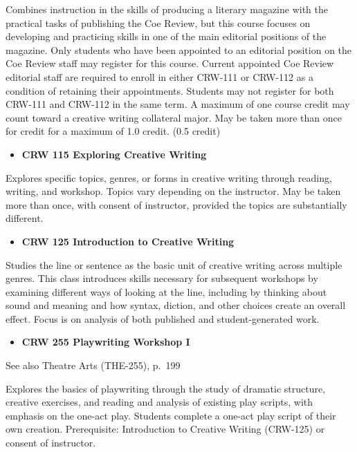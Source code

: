 \documentclass[
  letterpaper,
]{scrbook}
\providecommand{\tightlist}{%
  \setlength{\itemsep}{0pt}\setlength{\parskip}{0pt}}
\begin{document}
Combines instruction in the skills of producing a literary magazine with
the practical tasks of publishing the Coe Review, but this course
focuses on developing and practicing skills in one of the main editorial
positions of the magazine. Only students who have been appointed to an
editorial position on the Coe Review staff may register for this course.
Current appointed Coe Review editorial staff are required to enroll in
either CRW-111 or CRW-112 as a condition of retaining their
appointments. Students may not register for both CRW-111 and CRW-112 in
the same term. A maximum of one course credit may count toward a
creative writing collateral major. May be taken more than once for
credit for a maximum of 1.0 credit. (0.5 credit)

\begin{itemize}
\tightlist
\item
  \textbf{CRW 115 Exploring Creative Writing}
\end{itemize}

Explores specific topics, genres, or forms in creative writing through
reading, writing, and workshop. Topics vary depending on the instructor.
May be taken more than once, with consent of instructor, provided the
topics are substantially different.

\begin{itemize}
\tightlist
\item
  \textbf{CRW 125 Introduction to Creative Writing}
\end{itemize}

Studies the line or sentence as the basic unit of creative writing
across multiple genres. This class introduces skills necessary for
subsequent workshops by examining different ways of looking at the line,
including by thinking about sound and meaning and how syntax, diction,
and other choices create an overall effect. Focus is on analysis of both
published and student-generated work.

\begin{itemize}
\tightlist
\item
  \textbf{CRW 255 Playwriting Workshop I}
\end{itemize}

See also Theatre Arts (THE-255), p.~199

Explores the basics of playwriting through the study of dramatic
structure, creative exercises, and reading and analysis of existing play
scripts, with emphasis on the one-act play. Students complete a one-act
play script of their own creation. Prerequisite: Introduction to
Creative Writing (CRW-125) or consent of instructor.
\end{document}
